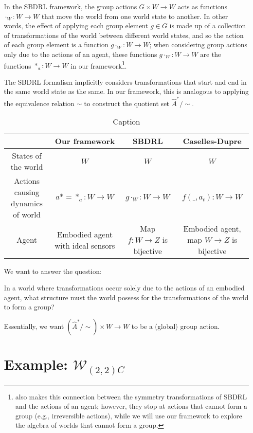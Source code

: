 In the SBDRL framework, the group actions $G \times W \to W$ acts as functions $\cdot_{W}: W \to W$ that move the world from one world state to another.
In other words, the effect of applying each group element $g \in G$ is made up of a collection of transformations of the world between different world states, and so the action of each group element is a function $g \cdot_{W}: W \to W$; when considering group actions only due to the actions of an agent, these functions $g \cdot_{W}: W \to W$ are the functions $*_{a}: W \to W$ in our framework\footnote{\autocite{caselles2019symmetry} also makes this connection between the symmetry transformations of SBDRL and the actions of an agent; however, they stop at actions that cannot form a group (e.g., irreversible actions), while we will use our framework to explore the algebra of worlds that cannot form a group.}.

The SBDRL formalism implicitly considers transformations that 
start and end in the same world state as the same.
In our framework, this is analogous to applying the equivalence relation $\sim$ to construct the quotient set $\hat{A}^{*}/\sim$.

\begin{table}[H]
    \centering
    \begin{tabular}{|c|c|c|c|}
         & Our framework    & SBDRL     & Caselles-Dupre \\
         \hline
         States of the world & $W$ & $W$ & $W$ \\
         Actions causing dynamics of world & $a* = *_{a}: W \to W$ & $g \cdot_{W}: W \to W$ & $f(\_, a_{t}): W \to W$ \\
         Agent & Embodied agent with ideal sensors & Map $f: W \to Z$ is bijective & Embodied agent, map $W \to Z$ is bijective
    \end{tabular}
    \caption{Caption}
    \label{tab:my_label}
\end{table}

We want to answer the question:
\begin{center}
    In a world where transformations occur solely due to the actions of an embodied agent, what structure must the world possess for the transformations of the world to form a group?
\end{center}


Essentially, we want $(\hat{A}^{*}/\sim) \times W \to W$ to be a (global) group action.


\section{Example: $\mathscr{W}_{(2,2)C}$}

